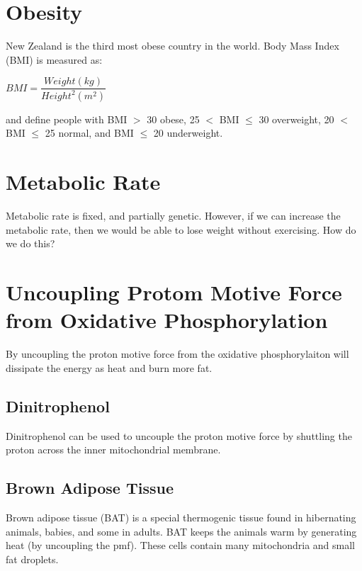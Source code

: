 \section{Obesity}

New Zealand is the third most obese country in the world.
Body Mass Index (BMI) is measured as:
\begin{center}
$BMI = \dfrac{Weight (kg)}{Height^2 (m^2)}$
\end{center}
and define people with BMI $>$ 30 obese, 25 $<$ BMI $\leq$ 30 overweight, 20 $<$ BMI $\leq$ 25 normal, and BMI $\leq$ 20 underweight.

\begin{center}
\end{center}

\section{Metabolic Rate}

Metabolic rate is fixed, and partially genetic.
However, if we can increase the metabolic rate, then we would be able to lose weight without exercising.
How do we do this?

\section{Uncoupling Protom Motive Force from Oxidative Phosphorylation}

By uncoupling the proton motive force from the oxidative phosphorylaiton will dissipate the energy as heat and burn more fat.

\subsection{Dinitrophenol}

Dinitrophenol can be used to uncouple the proton motive force by shuttling the proton across the inner mitochondrial membrane.

\subsection{Brown Adipose Tissue}

Brown adipose tissue (BAT) is a special thermogenic tissue found in hibernating animals, babies, and some in adults.
BAT keeps the animals warm by generating heat (by uncoupling the pmf).
These cells contain many mitochondria and small fat droplets.

